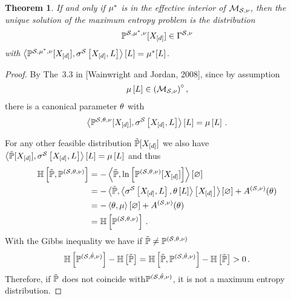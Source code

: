 \documentclass[aps,onecolumn,nofootinbib,pra]{article}
\newtheorem{theorem}{Theorem}
\begin{document}
    \begin{theorem} %
        \label{the:maxEntropyInterior}
        If and only if $\mu^*$ is in the effective interior of $\mathcal{M}_{\mathcal{S},\nu}$, then the unique solution of the maximum entropy problem is the distribution
        \begin{align*}
            \mathbb{P}^{\mathcal{S},\mu^*,\nu}[X_{[d]}]\in\Gamma^{\mathcal{S},\nu}
        \end{align*}
        with $\left\langle \mathbb{P}^{\mathcal{S},\mu^*,\nu}[X_{[d]}],\sigma^{\mathcal{S}}\left[X_{[d]},L\right]\right\rangle \left[ L \right]=\mu^*[L]$.
    \end{theorem}
    \begin{proof}
        By The~3.3 in [Wainwright and Jordan, 2008], since by assumption
        \begin{align*}
            \mu\left[L\right] \in {\left(\mathcal{M}_{\mathcal{S},\nu}\right)}^{\circ}  \, ,
        \end{align*}
        there is a canonical parameter $\theta$ with
        \begin{align*}
            \left\langle \mathbb{P}^{\mathcal{S},\theta,\nu}[X_{[d]}],\sigma^{\mathcal{S}}\left[X_{[d]},L\right]\right\rangle \left[ L \right]=\mu\left[L\right] \, .
        \end{align*}

        For any other feasible distribution $\tilde{\mathbb{P}}[X_{[d]}]$ we also have $\left\langle \tilde{\mathbb{P}}[X_{[d]}],\sigma^{\mathcal{S}}\left[X_{[d]},L\right]\right\rangle \left[ L \right]=\mu\left[L\right]$ and thus
        \begin{align*}
            \mathbb{H}\left[\tilde{\mathbb{P}},\mathbb{P}^{(\mathcal{S},\theta,\nu)}\right]
            &= -\left\langle \tilde{\mathbb{P}},\ln \left[ \mathbb{P}^{(\mathcal{S},\theta,\nu)}[X_{[d]}] \right]\right\rangle \left[ \varnothing \right] \\
            &= -\left\langle \tilde{\mathbb{P}},\left\langle \sigma^{\mathcal{S}}\left[X_{[d]},L\right],\theta\left[L\right]\right\rangle \left[ X_{[d]} \right]\right\rangle \left[ \varnothing \right] + A^{(\mathcal{S},\nu)}(\theta) \\
            &= - \left\langle \theta,\mu\right\rangle \left[ \varnothing \right] + A^{(\mathcal{S},\nu)}(\theta) \\
            &= \mathbb{H}\left[\mathbb{P}^{(\mathcal{S},\theta,\nu)}\right] \, .
        \end{align*}
        With the Gibbs inequality we have if $\tilde{\mathbb{P}}\neq\mathbb{P}^{(\mathcal{S},\theta,\nu)}$
        \begin{align*}
            \mathbb{H}\left[\mathbb{P}^{(\mathcal{S},\hat{\theta},\nu)}\right] - \mathbb{H}\left[\tilde{\mathbb{P}}\right]
            = \mathbb{H}\left[\tilde{\mathbb{P}},\mathbb{P}^{(\mathcal{S},\hat{\theta},\nu)}\right] - \mathbb{H}\left[\tilde{\mathbb{P}}\right] > 0 \, .
        \end{align*}
        Therefore, if $\tilde{\mathbb{P}}$ does not coincide with$\mathbb{P}^{(\mathcal{S},\hat{\theta},\nu)}$, it is not a maximum entropy distribution.
    \end{proof}
\end{document}
